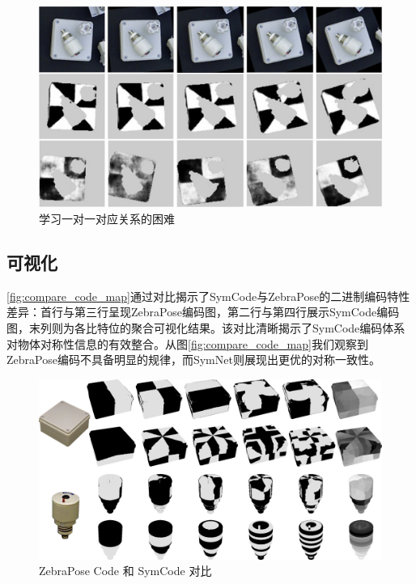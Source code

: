 \begin{figure}[ht]
    \centerline{\includegraphics[width=1.0\textwidth]{figure/symnet/difficulty_learn_one_to_one.jpg}}
    \caption{学习一对一对应关系的困难}
    \label{fig:difficult_learn_one_to_one}
\end{figure}

\subsection{可视化} 

\autoref{fig:compare_code_map}通过对比揭示了SymCode与ZebraPose的二进制编码特性差异：首行与第三行呈现ZebraPose编码图，第二行与第四行展示SymCode编码图，末列则为各比特位的聚合可视化结果。该对比清晰揭示了SymCode编码体系对物体对称性信息的有效整合。从图\autoref{fig:compare_code_map}我们观察到ZebraPose编码不具备明显的规律，而SymNet则展现出更优的对称一致性。

\begin{figure}[htbp]
        \centerline{\includegraphics[width=1.0\textwidth]{figure/symnet/compare_code_map.jpg}}
        \caption{ZebraPose Code 和 SymCode 对比}
        \label{fig:compare_code_map}
\end{figure}

